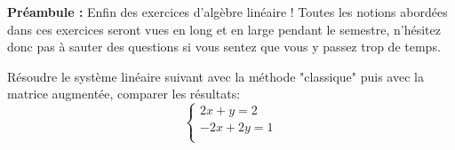 \begin{center}
\begin{tcolorbox}[boxrule=0pt,frame empty,width=\textwidth]
\textbf{Préambule :} Enfin des exercices d'algèbre linéaire ! Toutes les notions abordées dans ces exercices seront vues en long et en large pendant le semestre, n'hésitez donc pas à sauter des questions si vous sentez que vous y passez trop de temps.
\end{tcolorbox}
\end{center}


\begin{exercice}
Résoudre le système linéaire suivant avec la méthode "classique" puis avec la matrice augmentée, comparer les résultats:
\begin{equation*}
    \begin{cases}
    2x + y = 2 \\
    -2x + 2y = 1 \\
\end{cases}
\end{equation*} \\
\end{exercice}


